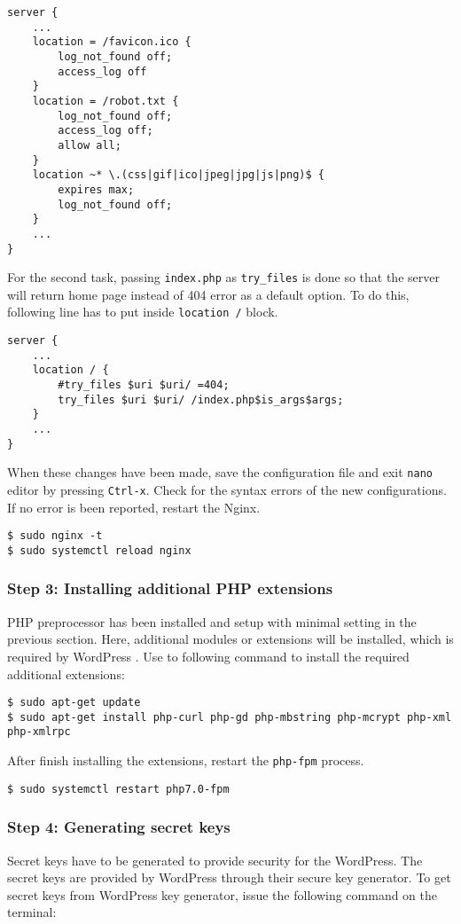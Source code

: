 \begin{lstlisting}
server {
	...
	location = /favicon.ico {
		log_not_found off;
		access_log off
	}
	location = /robot.txt {
		log_not_found off;
		access_log off;
		allow all;
	}
	location ~* \.(css|gif|ico|jpeg|jpg|js|png)$ {
		expires max;
		log_not_found off;
	}
	...
}
\end{lstlisting}

For the second task, passing \texttt{index.php} as \texttt{try\_files} is done so that the server will return home page instead of 404 error as a default option. To do this, following line has to put inside \texttt{location /} block.

\begin{lstlisting}
server {
	...
	location / {
		#try_files $uri $uri/ =404;
		try_files $uri $uri/ /index.php$is_args$args;
	}
	...
}
\end{lstlisting}

When these changes have been made, save the configuration file and exit \texttt{nano} editor by pressing \texttt{Ctrl-x}. Check for the syntax errors of the new configurations. If no error is been reported, restart the Nginx.

\begin{lstlisting}
$ sudo nginx -t
$ sudo systemctl reload nginx
\end{lstlisting}

\subsubsection*{Step 3: Installing additional PHP extensions}
PHP preprocessor has been installed and setup with minimal setting in the previous section. Here, additional modules or extensions will be installed, which is required by WordPress \cite{SugarHill.2016}. Use to following command to install the required additional extensions:

\begin{lstlisting}
$ sudo apt-get update
$ sudo apt-get install php-curl php-gd php-mbstring php-mcrypt php-xml php-xmlrpc
\end{lstlisting}

After finish installing the extensions, restart the \texttt{php-fpm} process.
\begin{lstlisting}
$ sudo systemctl restart php7.0-fpm
\end{lstlisting}

\subsubsection*{Step 4: Generating secret keys}
Secret keys have to be generated to provide security for the WordPress. The secret keys are provided by WordPress through their secure key generator. To get secret keys from WordPress key generator, issue the following command on the terminal:

